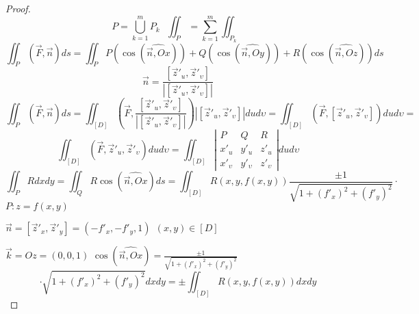 \begin{proof}
  $$
  P = \bigcup_{k=1}^m P_k ~~~ \iint_P = \sum_{k=1}^m \iint_{P_k}
  $$
  $$
  \iint_P (\vec F, \vec n) ds = \iint_P
  P(\cos(\widehat{\vec n, Ox})) +
  Q(\cos(\widehat{\vec n, Oy})) +
  R(\cos(\widehat{\vec n, Oz}))ds
  $$
  $$
  \vec n = \frac{[\vec z'_u, \vec z'_{\upsilon}]}
  {|[\vec z'_u, \vec z'_{\upsilon}]|}
  $$
  $$
  \iint_P (\vec F, \vec n) ds = \iint_{[D]} \left( \vec F,
  \frac{[\vec z'_u, \vec z'_{\upsilon}]}
  {|[\vec z'_u, \vec z'_{\upsilon}]|} \right) |[\vec z'_u, \vec z'_{\upsilon}]|
  du d\upsilon = \iint_{[D]} (\vec F,[\vec z'_u, \vec z'_{\upsilon}])du
  d\upsilon =
  $$
  $$
  \iint_{[D]} (\vec F, \vec z'_u , \vec z'_{\upsilon}) du d\upsilon
  = \iint_{[D]}
  \left|
  \begin{array}{ccc}
    P & Q & R \\
    x'_u & y'_u & z'_u \\
    x'_{\upsilon} & y'_{\upsilon} & z'_{\upsilon}
  \end{array}
  \right| du d\upsilon
  $$
  $$
  \iint_P R dx dy = \iint_Q R \cos(\widehat{\vec n, Ox}) ds = \iint_{[D]}
  R(x,y,f(x,y)) \frac{\pm 1}{\sqrt{1 + (f'_x)^2 + (f'_y)^2}} \cdot
  $$
  $P: z = f(x,y)$

  $\vec n = [\vec z'_x, \vec z'_y] = (-f'_x, -f'_y, 1) ~~ (x,y) \in [D]$

  $\vec k = Oz = (0,0,1)$
  $\cos(\widehat{\vec n, Ox}) = \frac{\pm 1}{\sqrt{1 + (f'_x)^2 + (f'_y)^2}}$
  $$
  \cdot \sqrt{1 + (f'_x)^2 + (f'_y)^2} dx dy = \pm \iint_{[D]} R(x,y, f(x,y))
  dx dy
  $$
\end{proof}
